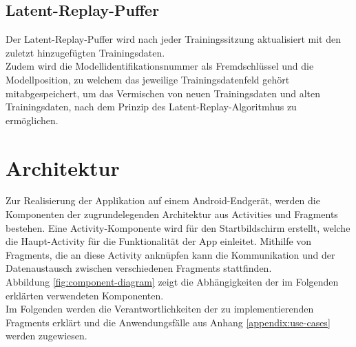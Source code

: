 \documentclass[oneside]{ausarbeitung}
\begin{document}
\subsection{Latent-Replay-Puffer}
Der Latent-Replay-Puffer wird nach jeder Trainingssitzung aktualisiert mit den zuletzt hinzugefügten Trainingsdaten.\\
Zudem wird die Modellidentifikationsnummer als Fremdschlüssel und die Modellposition, zu welchem das jeweilige Trainingsdatenfeld gehört mitabgespeichert, um das Vermischen von neuen Trainingsdaten und alten Trainingsdaten, nach dem Prinzip des Latent-Replay-Algoritmhus zu ermöglichen.
\section{Architektur}
\label{cha:architecture}
Zur Realisierung der Applikation auf einem Android-Endgerät, werden die Komponenten der zugrundelegenden Architektur aus Activities und Fragments bestehen. Eine Activity-Komponente wird für den Startbildschirm erstellt, welche die Haupt-Activity für die Funktionalität der App einleitet. Mithilfe von Fragments, die an diese Activity anknüpfen kann die Kommunikation und der Datenaustausch zwischen verschiedenen Fragments stattfinden.\\
Abbildung \ref{fig:component-diagram} zeigt die Abhängigkeiten der im Folgenden erklärten verwendeten Komponenten.\\
Im Folgenden werden die Verantwortlichkeiten der zu implementierenden Fragments erklärt und die Anwendungsfälle aus Anhang \ref{appendix:use-cases} werden zugewiesen.
\end{document}

